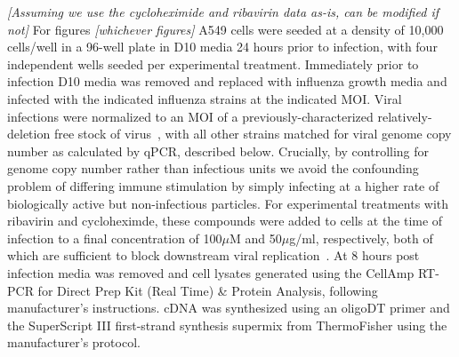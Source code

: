 \documentclass[9pt,lineno]{elife}
\newcommand{\abrcomment}[1]{\emph{\color{blue} [#1]}}
\begin{document}
\abrcomment{Assuming we use the cycloheximide and ribavirin data as-is, can be modified if not}
For figures \abrcomment{whichever figures} A549 cells were seeded at a density of 10,000 cells/well in a 96-well plate in D10 media 24 hours prior to infection, with four independent wells seeded per experimental treatment. 
Immediately prior to infection D10 media was removed and replaced with influenza growth media and infected with the indicated influenza strains at the indicated MOI.
Viral infections were normalized to an MOI of a previously-characterized relatively-deletion free stock of virus~\citep{russell2018extreme}, with all other strains matched for viral genome copy number as calculated by qPCR, described below.
Crucially, by controlling for genome copy number rather than infectious units we avoid the confounding problem of differing immune stimulation by simply infecting at a higher rate of biologically active but non-infectious particles.
For experimental treatments with ribavirin and cycloheximde, these compounds were added to cells at the time of infection to a final concentration of 100$\mu$M and 50$\mu$g/ml, respectively, both of which are sufficient to block downstream viral replication~\citep{Vanderlinden:2016ec,Reuther:2015ef,Scholtissek:1976wg,killip2014activation}.
At 8 hours post infection media was removed and cell lysates generated using the CellAmp RT-PCR for Direct Prep Kit (Real Time) \& Protein Analysis, following manufacturer's instructions. 
cDNA was synthesized using an oligoDT primer and the SuperScript III first-strand synthesis supermix from ThermoFisher using the manufacturer's protocol. 
\end{document}

